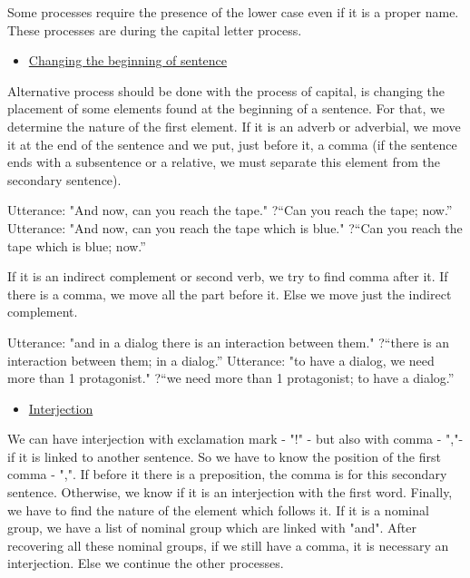 \documentclass[twoside,a4paper,10pt]{report}
\begin{document}
Some processes require the presence of the lower case even if it is a proper name. These processes are during the capital letter process.



\begin{itemize}
    \item  \underline{Changing the beginning of sentence}
\end{itemize}
Alternative process should be done with the process of capital, is changing the placement of some elements found at the beginning of a sentence. For that, we determine the nature of the first element. If it is an adverb or adverbial, we move it at the end of the sentence and we put, just before it, a comma (if the sentence ends with a subsentence or a relative, we must separate this element from the secondary sentence).


\small
\begin{verbatimtab}
  Utterance: "And now, can you reach the tape."
  ?“Can you reach the tape; now.”
  Utterance: "And now, can you reach the tape which is blue."
  ?“Can you reach the tape which is blue; now.”
\end{verbatimtab}
\normalsize
If it is an indirect complement or second verb, we try to find comma after it. If there is a comma, we move all the part before it. Else we move just the indirect complement. 


\small
\begin{verbatimtab}
  Utterance: "and in a dialog there is an interaction between them."
  ?“there is an interaction between them; in a dialog.”
  Utterance: "to have a dialog, we need more than 1 protagonist."
  ?“we need more than 1 protagonist; to have a dialog.”
\end{verbatimtab}
\normalsize

\begin{itemize}
    \item  \underline{Interjection}
\end{itemize}
We can have interjection with exclamation mark - "!" - but also with comma - ","- if it is linked to another sentence. So we have to know the position of the first comma - ",". If before it there is a preposition, the comma is for this secondary sentence. Otherwise, we know if it is an interjection with the first word. Finally, we have to find the nature of the element which follows it. If it is a nominal group, we have a list of nominal group which are linked with "and". After recovering all these nominal groups, if we still have a comma, it is necessary an interjection. Else we continue the other processes.
\end{document}
